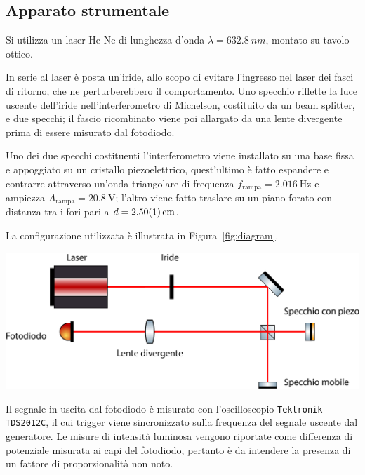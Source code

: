 \documentclass[10pt,oneside,a4paper]{article}
\newenvironment{Figure}
  {\par\medskip\noindent\minipage{\linewidth}}
  {\endminipage\par\medskip}
\begin{document}
\begin{multicols}{2}
\section{Apparato strumentale}

Si utilizza un laser He-Ne di lunghezza d'onda $\lambda = \SI{632.8}{nm}$, montato su tavolo ottico. 

In serie al laser è posta un'iride, allo scopo di evitare l'ingresso nel laser dei fasci di ritorno, che ne perturberebbero il comportamento. Uno specchio riflette la luce uscente dell'iride nell'interferometro di Michelson, costituito da un beam splitter, e due specchi; il fascio ricombinato viene poi allargato da una lente divergente prima di essere misurato dal fotodiodo.

Uno dei due specchi costituenti l'interferometro viene installato su una base fissa e appoggiato su un cristallo piezoelettrico, quest'ultimo è fatto espandere e contrarre attraverso un'onda triangolare di frequenza $f_\mathrm{rampa} = \SI{2.016}{\hertz}$ e ampiezza $A_\mathrm{rampa} = \SI{20.8}{\volt}$; l'altro viene fatto traslare su un piano forato con distanza tra i fori pari a $d = \SI{2.50 \pm 0.01}{cm}$. 

La configurazione utilizzata è illustrata in Figura~\ref{fig:diagram}.

\begin{Figure}
	\begin{center}
	\includegraphics[width=\linewidth]{diagram.png}
	\label{fig:diagram}
	\end{center}
\end{Figure}

Il segnale in uscita dal fotodiodo è misurato con l'oscilloscopio \texttt{Tektronik TDS2012C}, il cui trigger viene sincronizzato sulla frequenza del segnale uscente dal generatore. Le misure di intensità luminosa vengono riportate come differenza di potenziale misurata ai capi del fotodiodo, pertanto è da intendere la presenza di un fattore di proporzionalità non noto.


\end{multicols}
\end{document}
